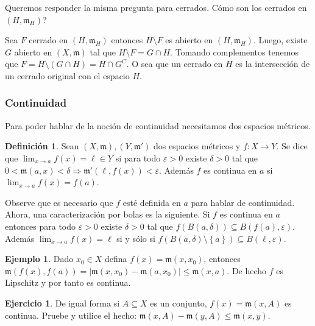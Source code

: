 \documentclass[12pt]{article}
\theoremstyle{plain}
\theoremstyle{definition}
\newtheorem{Def}[Th]{Definición}       %
\newtheorem{Ex}[Th]{Ejemplo}               %
\newtheorem{Ej}[Th]{Ejercicio}
\theoremstyle{remark}
\numberwithin{equation}{section}
\newcommand{\mm}{\mathfrak{m}}      %
\renewcommand{\leq}{\leqslant}      %
\renewcommand{\:}{\colon}           %
\newcommand{\conj}[1]{\left\lbrace#1\right\rbrace}
\begin{document}
\begin{multicols}{2}
Queremos responder la misma pregunta para cerrados. Cómo son los cerrados en $(H,\mm_H)$?\par
Sea $F$ cerrado en $(H,\mm_H)$ entonces $H\setminus F$ es abierto en $(H,\mm_H)$. Luego, existe $G$ abierto en $(X,\mm)$ tal que $H\setminus F = G\cap H$. Tomando complementos tenemos que $F=H\setminus(G\cap H)= H\cap G^C$. O sea que un cerrado en $H$ es la intersección de un cerrado original con el espacio $H$.

\subsubsection*{Continuidad}

Para poder hablar de la noción de continuidad necesitamos dos espacios métricos.

\begin{Def}
  Sean $(X,\mm),(Y,\mm')$ dos espacios métricos y $f\colon X\to Y$. Se dice que $\lim_{x\to a}f(x)=\ell\in Y$ si para todo $\varepsilon>0$ existe $\delta>0$ tal que
  $0<\mm(a,x)<\delta\Rightarrow \mm'(\ell,f(x))<\varepsilon$. Además $f$ es continua en $a$ si $\lim_{x\to a}f(x)=f(a)$.
\end{Def}
 Observe que es necesario que $f$ esté definida en $a$ para hablar de continuidad. Ahora, una caracterización por bolas es la siguiente. Si $f$ es continua en $a$ entonces para todo $\varepsilon>0$ existe $\delta >0$ tal que $f\left(B(a,\delta)\right)\subseteq B(f(a),\varepsilon)$. Además $\lim_{x\to a} f(x)=\ell$ si y sólo si $f\left(B(a,\delta)\setminus\conj{a}\right)\subseteq B(\ell,\varepsilon)$.

 \begin{Ex}
   Dado $x_0\in X$ defina $f(x)=\mm(x,x_0)$, entonces $\mm(f(x),f(a))=|\mm(x,x_0)-\mm(a,x_0)|\leq \mm(x,a)$. De hecho $f$ es Lipschitz y por tanto es continua.
 \end{Ex}

\begin{Ej}
  De igual forma si $A\subseteq X$ es un conjunto, $f(x)=\mm(x,A)$ es continua. Pruebe y utilice el hecho: $\mm(x,A)-\mm(y,A)\leq \mm(x,y)$.
\end{Ej}



\end{multicols}
\end{document}
